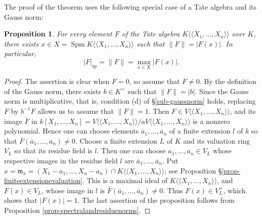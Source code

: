 \documentclass[a4paper,12pt, dvipdfmx]{jsbook}
\def\m{\mathfrak{m}}
\def\ovl#1{\overline{#1}}%
\def\sp{\mathop{\mathrm{sp}}\nolimits}
\def\Spm{\mathop{\mathrm{Spm}}\nolimits}
\def\dl{\langle\!\langle}
\def\dr{\rangle\!\rangle}
\newcommand{\abs}[1]{\lvert#1\rvert}
\newcommand{\abss}[1]{\|#1\|}
\theoremstyle{plain}
\newtheorem{prop}[thm]{\bfseries Proposition}
\theoremstyle{definition}
\begin{document}
The proof of the theorem uses the following special case of a Tate algebra and its Gauss norm:
\begin{prop}\label{prop-maximalmodulusprincipleTate}{\rm 
For every element $F$ of the Tate algebra $K\dl X_1,\ldots,X_n\dr$ over $K$, there exists $x\in X=\Spm K\dl X_1,\ldots,X_n\dr$ such that $\abss{F}=\abs{F(x)}$.
In particular,
$$
\abs{F}_{\sp}=\abss{F}=\max_{x\in X}\abs{F(x)}.
$$}
\end{prop}

\begin{proof}[Proof]
The assertion is clear when $F=0$, so assume that $F\neq 0$.
By the definition of the Gauss norm, there exists $b\in K^{\times}$ such that $\abss{F}=\abs{b}$.
Since the Gauss norm is multiplicative, that is, condition (d) of \S\ref{sub-gaussnorm} holds, replacing $F$ by $b^{-1}F$ allows us to assume that $\abss{F}=1$.
Then $F\in V\dl X_1,\ldots,X_n\dr$, and its image $\ovl{F}$ in $k[X_1,\ldots,X_n]=V\dl X_1,\ldots,X_n\dr/aV\dl X_1,\ldots,X_n\dr$ is a nonzero polynomial.
Hence one can choose elements $\ovl{a}_1,\ldots,\ovl{a}_n$ of a finite extension $l$ of $k$ so that $\ovl{F}(\ovl{a}_1,\ldots,\ovl{a}_n)\neq 0$.
Choose a finite extension $L$ of $K$ and its valuation ring $V_L$ so that its residue field is $l$. Then one can choose $a_1,\ldots,a_n\in V_L$ whose respective images in the residue field $l$ are $\ovl{a}_1,\ldots,\ovl{a}_n$.
Put $x=\m_x=(X_1-a_1,\ldots,X_n-a_n)\cap K\dl X_1,\ldots,X_n\dr$; see Proposition \S\ref{prop-finiteextensionevaluation}. This is a maximal ideal of $K\dl X_1,\ldots,X_n\dr$, and $F(x)\in V_L$, whose image in $l$ is $\ovl{F}(\ovl{a}_1,\ldots,\ovl{a}_n)\neq 0$.
Thus $F(x)\in V^{\times}_L$, which shows that $\abs{F(x)}=1$.
The last assertion of the proposition follows from Proposition \ref{prop-spectralandresiduenorms}.
\end{proof}
\end{document}
